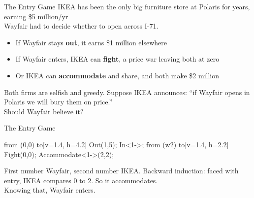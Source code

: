 \begin{frame}{The Entry Game}
IKEA has been the only big furniture store at Polaris for years, earning \$5 million/yr\\
Wayfair had to decide whether to open across I-71.
\bsk
\begin{itemize}
    \item If Wayfair stays \textbf{out}, it earns \$1 million elsewhere
    \item If Wayfair enters, IKEA can \textbf{fight}, a price war leaving both at zero
    \item Or IKEA can \textbf{accommodate} and share, and both make \$2 million
\end{itemize}
\bsk
Both firms are selfish and greedy.
\vfill
Suppose IKEA announces: ``if Wayfair opens in Polaris we will bury them on price.''\\
Should Wayfair believe it?
\vspace{-0.3in}
\end{frame}

\begin{frame}{The Entry Game}
\centering
\begin{gametree}[player names={Wayfair, IKEA}, scale=0.95]
  \branch[player=1, root=w, label=90] from (0,0) to[v=1.4, h=4.2]
    {Out(1,5); In<1->};
  \branch[player=2, label=0] from (w2) to[v=1.4, h=2.2]
    {Fight(0,0); Accommodate<1->(2,2)};
\end{gametree}
\bsk
\raggedright
{\footnotesize First number Wayfair, second number IKEA.}
\bsk
Backward induction: faced with entry, IKEA compares 0 to 2. So it accommodates.\\
Knowing that, Wayfair enters.
\vspace{-0.2in}
\end{frame}

